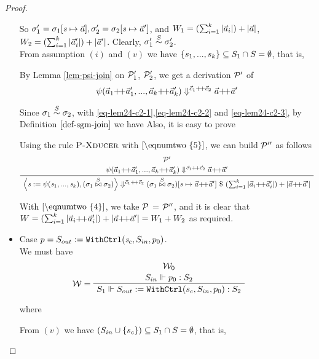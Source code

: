 \begin{proof}
\begin{itemize}
	So  $\sgm_1' = \sgm_1[\s \|-> \a], \sgm_2' = \sgm_2[\s \|-> \a']$, and $W_1 = (\sum_{i=1}^{k}|\a_i|) + |\a|$, $W_2 = (\sum_{i=1}^{k}|\a'_i|) + |\a'|$. 
	Clearly, $\sgm_1' \~\S \sgm_2'$. \\
	
	From assumption $(i)$ and $(v)$ we have $\{s_1,...,s_k\} \subseteq \S_1 \cap \S = \emptyset$,
    that is, 

    
    By Lemma \ref{lem-psi-join} on $\MP'_{1}$, $\MP'_{2}$, we get a derivation $\MP'$ of 
    \[ \sevalfg{\lcall}{\a_1  {\++} \a_1',...,\a_k {\++} \a_k' } 
             {\c_1 {\++} \c_2} {\a {\++} \a'} \]
    
    Since $\sgm_1 \~{\S} \sgm_2$, 
    with \eqref{eq-lem24-c2-1},\eqref{eq-lem24-c2-2} and \eqref{eq-lem24-c2-3}, 
    by Definition $\ref{def-sgm-join}$ we have
 	Also, it is easy to prove 
 
    Using the rule $\PName{Xducer}$ with $\eqref{\eqnumtwo{5}}$, we can build $\MP''$ as follows
   	$$\PT{\UCN{\MP'}{\sevalfg{\lcall}{\a_1  {\++} \a_1',...,\a_k {\++} \a_k' } 
   			{\c_1 {\++} \c_2} {\a {\++} \a'}}
    	\UC{\seval{\casetwo}{\sgmx}{\c_1 {\++} \c_2}{\sgmx[\s \|-> \a {\++} \a']}{(\sum_{i=1}^{k}|\a_i{\++}\a'_i|) + |\a{\++} \a'|}}
    } $$
   
   
    With $\eqref{\eqnumtwo{4}}$, we take $\MP$  = $\MP''$,
    and it is clear that $W = (\sum_{i=1}^{k}|\a_i{\++}\a'_i|) + |\a{\++} \a'| = W_1 + W_2$ as required.
 
   	

\item Case $p = \withctrl{\s_c}{p_0}{\Sin}{\Sout}$.\\
\def\eqnumthree#1{eq-lem24-c3-{#1}}
	We must have  
	$$
		\PT{\UCN{\MW_0}{\wf{p_0}{\Sin}{\S_2}}
			\LeLa{\MW = }		
			\UC{\wf{\withctrl{s_c}{p_0}{\Sin}{\Sout}}{\S_1}{\S_2}}  
	}$$

where  
 
From $(v)$ we have $(\Sin \cup \{s_c\})  \subseteq \S_1 \cap \S = \emptyset$, that is,
		
\def\casethree{\withctrl{\s_c}{p_0}{\Sin}{\Sout}}


\end{itemize}
\end{proof}
